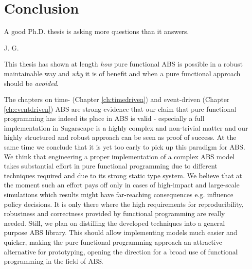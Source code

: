 \chapter{Conclusion}
\epigraph{A good Ph.D. thesis is asking more questions than it answers.}{J. G.}
\label{ch:conclusion}

This thesis has shown at length \textit{how} pure functional ABS is possible in a robust maintainable way and \textit{why} it is of benefit and when a pure functional approach should be \textit{avoided}.

The chapters on time- (Chapter \ref{ch:timedriven}) and event-driven (Chapter \ref{ch:eventdriven}) ABS are strong evidence that our claim that pure functional programming has indeed its place in ABS is valid - especially a full implementation in Sugarscape is a highly complex and non-trivial matter and our highly structured and robust approach can be seen as proof of success. At the same time we conclude that it is yet too early to pick up this paradigm for ABS. We think that engineering a proper implementation of a complex ABS model takes substantial effort in pure functional programming due to different techniques required and due to its strong static type system. We believe that at the moment such an effort pays off only in cases of high-impact and large-scale simulations which results might have far-reaching consequences e.g. influence policy decisions. It is only there where the high requirements for reproducibility, robustness and correctness provided by functional programming are really needed. Still, we plan on distilling the developed techniques into a general purpose ABS library. This should allow implementing models much easier and quicker, making the pure functional programming approach an attractive alternative for prototyping, opening the direction for a broad use of functional programming in the field of ABS.

